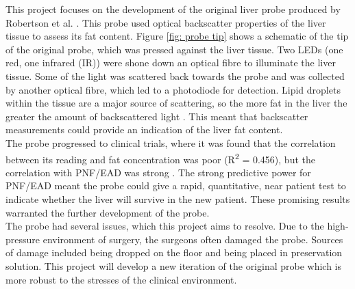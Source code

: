 This project focuses on the development of the original liver probe produced by Robertson et al. \cite{Robertson}. This probe used optical backscatter properties of the liver tissue to assess its fat content. Figure \ref{fig: probe tip} shows a schematic of the tip of the original probe, which was pressed against the liver tissue. Two LEDs (one red, one infrared (IR)) were shone down an optical fibre to illuminate the liver tissue. Some of the light was scattered back towards the probe and was collected by another optical fibre, which led to a photodiode for detection. Lipid droplets within the tissue are a major source of scattering, so the more fat in the liver the greater the amount of backscattered light \cite{McLaughlin}. This meant that backscatter measurements could provide an indication of the liver fat content.\\

The probe progressed to clinical trials, where it was found that the correlation between its reading and fat concentration was poor (R\textsuperscript{2} = 0.456), but the correlation with PNF/EAD was strong \cite{Robertson}. The strong predictive power for PNF/EAD meant the probe could give a rapid, quantitative, near patient test to indicate whether the liver will survive in the new patient. These promising results warranted the further development of the probe.\\

The probe had several issues, which this project aims to resolve. Due to the high-pressure environment of surgery, the surgeons often damaged the probe. Sources of damage included being dropped on the floor and being placed in preservation solution. This project will develop a new iteration of the original probe which is more robust to the stresses of the clinical environment.




